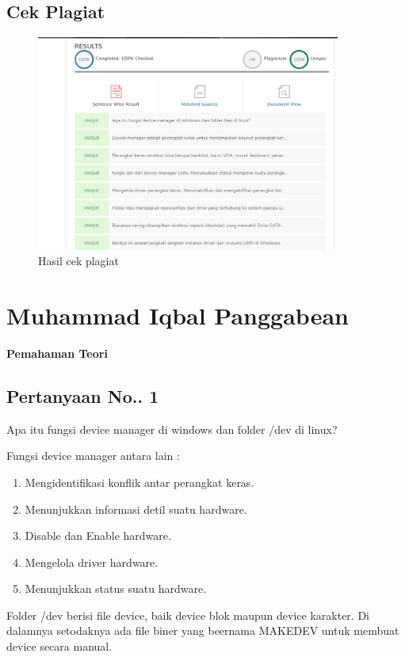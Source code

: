 	

	\subsection{Cek Plagiat}
	\begin{figure}[H]
		\includegraphics[width=10cm]{figures/chapter5/1174057/teori/plagiarisme.png}
		\centering
		\caption{Hasil cek plagiat}
	\end{figure}
	
	
\section{Muhammad Iqbal Panggabean}
{\Large \textbf{Pemahaman Teori}}
\subsection{Pertanyaan No.. 1}
Apa itu fungsi device manager di windows dan folder /dev di linux?

\hfill \break
Fungsi device manager antara lain :
\begin{enumerate}
	\item Mengidentifikasi konflik antar perangkat keras.
	\item Menunjukkan informasi detil suatu hardware.
	\item Disable dan Enable hardware.
	\item Mengelola driver hardware.
	\item Menunjukkan status suatu hardware.
\end{enumerate}

\hfill \break
Folder /dev berisi file device, baik device blok maupun device karakter. Di dalamnya setodaknya ada file biner yang beernama MAKEDEV untuk membuat device secara manual.

